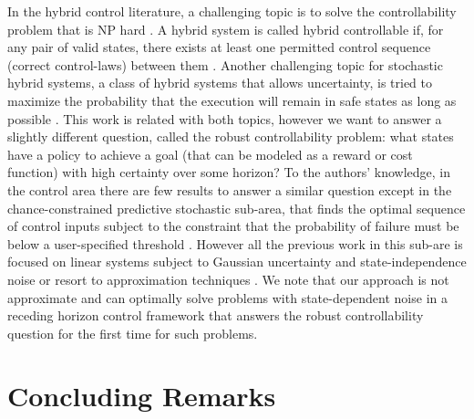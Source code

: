\documentclass[letterpaper]{article}
\begin{document}
In the hybrid control literature, a challenging topic is to solve the
controllability problem that is NP hard \cite{Blondel:1999}. A hybrid
system is called hybrid controllable if, for any pair of valid states,
there exists at least one permitted control sequence (correct
control-laws) between them \cite{Tittus:1998,Yang:2007}.  Another
challenging topic for stochastic hybrid systems, a class of hybrid
systems that allows uncertainty, is tried to maximize the probability
that the execution will remain in safe states as long as
possible \cite{Hu:2000}.  This work is related with both topics,
however we want to answer a slightly different question, called the
robust controllability problem: what states have a policy to achieve a
goal (that can be modeled as a reward or cost function) with high
certainty over some horizon?  To the authors’ knowledge, in the
control area there are few results to answer a similar question except
in the chance-constrained predictive stochastic sub-area, that finds
the optimal sequence of control inputs subject to the constraint that
the probability of failure must be below a user-specified
threshold \cite{Blackmore:2011}. However all the previous work in this
sub-are is focused on linear systems subject to Gaussian uncertainty
and state-independence
noise \cite{Schwarm:1999,Li:2002,Ono:2008,Blackmore:2011} or resort to
approximation techniques \cite{Blackmore:2010}.  We note that 
our approach is not approximate and can optimally solve problems with
state-dependent noise in a receding horizon control framework that
answers the robust controllability question for the first time for such
problems.

\section{Concluding Remarks}
\end{document}
